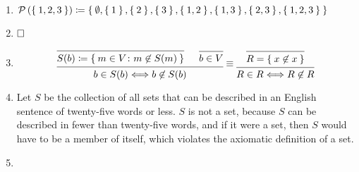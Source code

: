 \documentclass[nobib]{tufte-book}
\newcommand{\powerset}[1]{\mathcal{P}\left(#1\right)}
\begin{document}
\begin{enumerate}
\item $\powerset{\Set{1,2,3}} \coloneqq \Set{
  \emptyset,
  \Set{1},    \Set{2},   \Set{3},
  \Set{1,2},  \Set{1,3}, \Set{2,3},
  \Set{1,2,3}
}$

\item
  \begin{prooftree*}
  \end{prooftree*}
  $\hfill\square$

\item
  \[
    \begin{prooftree}
      \infer0{ S(b) \coloneqq \Set{ m \in V \colon m \not\in S(m) } }
      \infer0{ b \in V }
      \infer2{ b \in S(b) \Leftarrow\!\Rightarrow b \not\in S(b) }
    \end{prooftree}
    \equiv
    \begin{prooftree}
      \infer0{ R = \Set{ x \not\in x } }
      \infer1{ R \in R \Leftarrow\!\Rightarrow R \not\in R }
    \end{prooftree}
  \]

\item Let $S$ be the collection of all sets that can be described in an English
  sentence of twenty-five words or less. $S$ is not a set, because $S$ can be
  described in fewer than twenty-five words, and if it were a set, then $S$
  would have to be a member of itself, which violates the axiomatic definition
  of a set.

\item
  \begin{figure*}
\end{figure*}
\end{enumerate}
\end{document}
